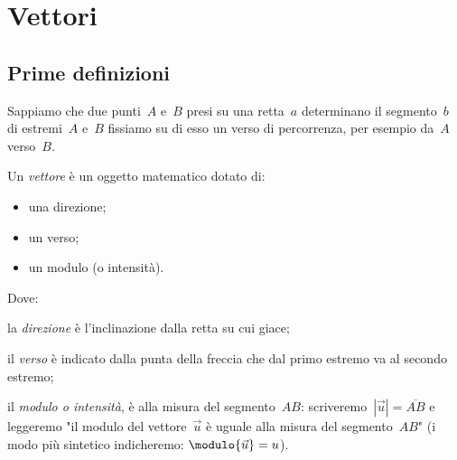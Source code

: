


\chapter{Vettori}

\section{Prime definizioni}
\label{sec:vett_primedefinizioni}

% 

Sappiamo che due punti~$A$ e~$B$ presi su una retta~$a$ determinano il 
segmento~$b$ di estremi~$A$ e~$B$ fissiamo su di esso un verso di percorrenza, 
per esempio da~$A$ verso~$B$.

\begin{definizione}
Un \emph{vettore} è un oggetto matematico dotato di:

\begin{minipage}{.39 \textwidth}
\begin{itemize}
 \item una direzione;
 \item un verso;
 \item un modulo (o intensità).
\end{itemize}
\end{minipage}
\hfill
\begin{minipage}{.59 \textwidth}
 \begin{inaccessibleblock}
 \begin{center}
  \vettoredef
 \end{center}
\end{inaccessibleblock}
\end{minipage}
\end{definizione}

Dove:
\begin{itemize*}
\item la \emph{direzione} è l'inclinazione dalla retta su cui giace;
\item il \emph{verso} è indicato dalla punta della freccia che dal primo 
estremo va al secondo estremo;
\item il \emph{modulo o intensità}, è alla misura del segmento~$AB$: 
scriveremo~$|\vec{u}|=\overline{AB}$ e leggeremo "il modulo del 
vettore~$\vec{u}$ è uguale alla misura del segmento~$AB$"
(i modo più sintetico indicheremo: \(\modulo{\vec{u}} = u\)).
\end{itemize*}

